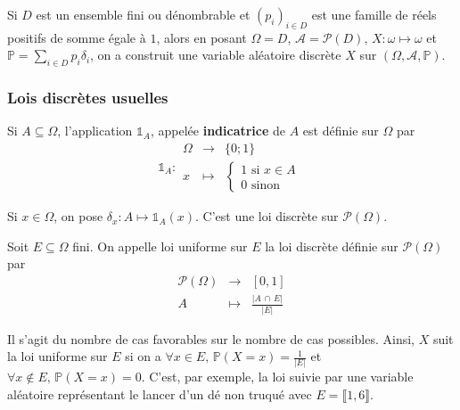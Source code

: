   \begin{remark}
    Si $D$ est un ensemble fini ou dénombrable et $(p_i)_{i \in D}$ est une famille de réels positifs de somme égale à $1$, alors en posant $\Omega = D$, $\mathcal{A} = \mathcal{P}(D)$, $X : \omega \mapsto \omega$ et $\mathbb{P} = \sum_{i \in D} p_i \delta_i$, on a construit une variable aléatoire discrète $X$ sur $(\Omega, \mathcal{A}, \mathbb{P})$.
  \end{remark}

  \subsubsection{Lois discrètes usuelles}


  \begin{definition}
    Si $A \subseteq \Omega$, l'application $\mathbb{1}_A$, appelée \textbf{indicatrice} de $A$ est définie sur $\Omega$ par
    \[
      \mathbb{1}_A :
      \begin{array}{ccc}
        \Omega &\rightarrow& \{ 0; 1 \} \\
        x &\mapsto& \begin{cases}
          1 \text{ si } x \in A \\
          0 \text{ sinon}
        \end{cases}
      \end{array}
    \]
  \end{definition}

  \begin{example}
    \label{264-1}
    Si $x \in \Omega$, on pose $\delta_x : A \mapsto \mathbb{1}_A(x)$. C'est une loi discrète sur $\mathcal{P}(\Omega)$.
  \end{example}

  \begin{example}
    Soit $E \subseteq \Omega$ fini. On appelle loi uniforme sur $E$ la loi discrète définie sur $\mathcal{P}(\Omega)$ par
    \[
    \begin{array}{ccc}
      \mathcal{P}(\Omega) &\rightarrow& [0,1] \\
      A &\mapsto& \frac{\vert A \, \cap \, E \vert}{\vert E \vert}
    \end{array}
    \]
  \end{example}

  \begin{remark}
    Il s'agit du nombre de cas favorables sur le nombre de cas possibles. Ainsi, $X$ suit la loi uniforme sur $E$ si on a $\forall x \in E, \, \mathbb{P}(X=x) = \frac{1}{\vert E \vert}$ et $\forall x \notin E, \, \mathbb{P}(X=x) = 0$.
    \newpar
    C'est, par exemple, la loi suivie par une variable aléatoire représentant le lancer d'un dé non truqué avec $E = \llbracket 1, 6 \rrbracket$.
  \end{remark}

